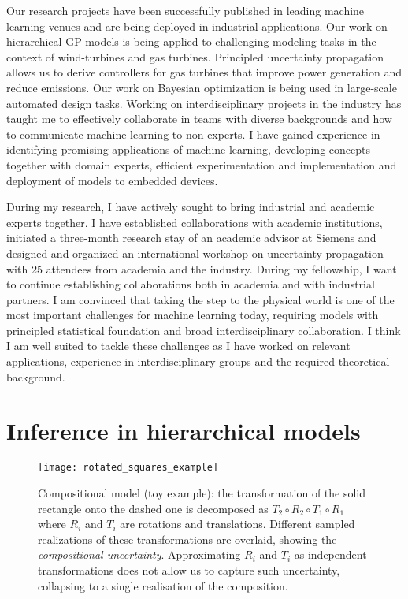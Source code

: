 Our research projects have been successfully published in leading machine learning venues and are being deployed in industrial applications.
Our work on hierarchical GP models is being applied to challenging modeling tasks in the context of wind-turbines and gas turbines.
Principled uncertainty propagation allows us to derive controllers for gas turbines that improve power generation and reduce emissions.
Our work on Bayesian optimization is being used in large-scale automated design tasks.
Working on interdisciplinary projects in the industry has taught me to effectively collaborate in teams with diverse backgrounds and how to communicate machine learning to non-experts.
I have gained experience in identifying promising applications of machine learning, developing concepts together with domain experts, efficient experimentation and implementation and deployment of models to embedded devices.

During my research, I have actively sought to bring industrial and academic experts together.
I have established collaborations with academic institutions, initiated a three-month research stay of an academic advisor at Siemens and designed and organized an international workshop on uncertainty propagation with 25 attendees from academia and the industry.
During my fellowship, I want to continue establishing collaborations both in academia and with industrial partners.
I am convinced that taking the step to the physical world is one of the most important challenges for machine learning today, requiring models with principled statistical foundation and broad interdisciplinary collaboration.
I think I am well suited to tackle these challenges as I have worked on relevant applications, experience in interdisciplinary groups and the required theoretical background.


\section{Inference in hierarchical models}
\begin{figure}[t]
    \centering
    \texttt{[image: rotated\_squares\_example]}
    \caption{
        \label{fig:rotated_squares_example}
        Compositional model (toy example): the transformation of the solid rectangle onto the dashed one is decomposed as $T_2 \circ R_2 \circ T_1 \circ R_1$ where $R_i$ and $T_i$ are rotations and translations. Different sampled realizations of these transformations are overlaid, showing the \emph{compositional uncertainty}. Approximating $R_i$ and $T_i$ as independent transformations does not allow us to capture such uncertainty, collapsing to a single realisation of the composition.
    }
\end{figure}


